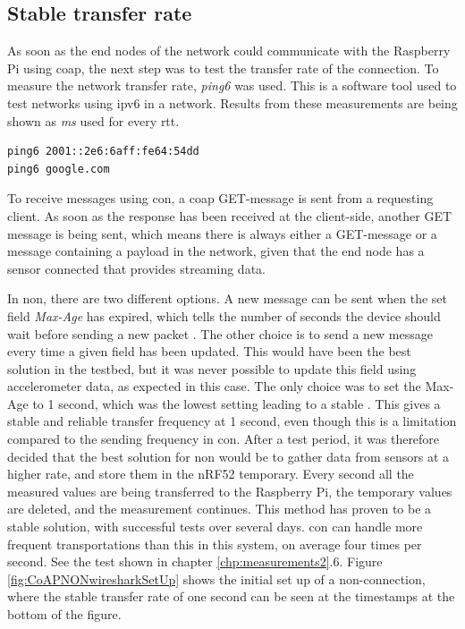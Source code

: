 \subsection{Stable transfer rate} \label{stableTransferRate}

\noindent As soon as the end nodes of the network could communicate with the Raspberry Pi using \gls{coap}, the next step was to test the transfer rate of the connection. To measure the network transfer rate, \textit{ping6} was used. This is a software tool used to test networks using \gls{ipv6} in a network. Results from these measurements are being shown as \textit{ms} used for every \acrlong{rtt}. 

\begin{verbatim}
ping6 2001::2e6:6aff:fe64:54dd
ping6 google.com
\end{verbatim}



\noindent To receive messages using \gls{con}, a \gls{coap} GET-message is sent from a requesting client. As soon as the response has been received at the client-side, another GET message is being sent, which means there is always either a GET-message or a message containing a \gls{payload} in the network, given that the end node has a sensor connected that provides streaming data. 

\noindent In \gls{non}, there are two different options. A new message can be sent when the set field \textit{Max-Age} has expired, which tells the number of seconds the device should wait before sending a new packet \cite{shelby2014constrained}. The other choice is to send a new message every time a given field has been updated. This would have been the best solution in the testbed, but it was never possible to update this field using accelerometer data, as expected in this case. The only choice was to set the Max-Age to 1 second, which was the lowest setting leading to a stable . This gives a stable and reliable transfer frequency at 1 second, even though this is a limitation compared to the sending frequency in \gls{con}. After a test period, it was therefore decided that the best solution for \gls{non} would be to gather data from sensors at a higher rate, and store them in the \gls{nRF52} temporary. Every second all the measured values are being transferred to the \gls{Raspberry Pi}, the temporary values are deleted, and the measurement continues. This method has proven to be a stable solution, with successful tests over several days. \gls{con} can handle more frequent transportations than this in this system, on average four times per second. See the test shown in chapter \ref{chp:measurements2}.6. Figure  \ref{fig:CoAPNONwiresharkSetUp} shows the initial set up of a \gls{non}-connection, where the stable transfer rate of one second can be seen at the timestamps at the bottom of the figure. 

